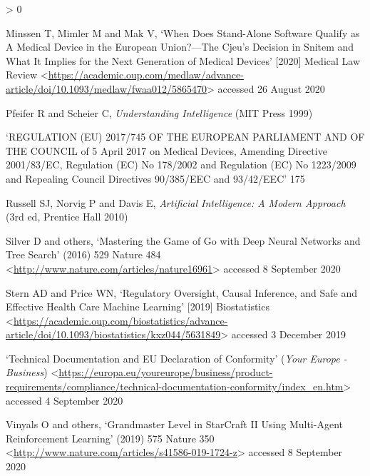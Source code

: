 \documentclass[
]{scrartcl}
\newlength{\cslhangindent}
\newenvironment{CSLReferences}[2] %
 {%
  \setlength{\parindent}{0pt}
  \ifodd #1 \everypar{\setlength{\hangindent}{\cslhangindent}}\ignorespaces\fi
  \ifnum #2 > 0
  \setlength{\parskip}{#2\baselineskip}
  \fi
 }%
 {}
\begin{document}
\begin{CSLReferences}{0}{0}
\leavevmode\hypertarget{ref-minssenWhenDoesStandAlone2020a}{}%
Minssen T, Mimler M and Mak V, {`When {Does Stand}-{Alone Software Qualify} as {A Medical Device} in the {European Union}?---{The Cjeu}'s {Decision} in {Snitem} and {What} It {Implies} for the {Next Generation} of {Medical Devices}'} {[}2020{]} Medical Law Review \textless{}\url{https://academic.oup.com/medlaw/advance-article/doi/10.1093/medlaw/fwaa012/5865470}\textgreater{} accessed 26 August 2020

\leavevmode\hypertarget{ref-pfeiferUnderstandingIntelligence1999a}{}%
Pfeifer R and Scheier C, \emph{Understanding Intelligence} ({MIT Press} 1999)

\leavevmode\hypertarget{ref-REGULATIONEU2017a}{}%
{`{REGULATION} ({EU}) 2017/745 {OF THE EUROPEAN PARLIAMENT AND OF THE COUNCIL} of 5 {April} 2017 on Medical Devices, Amending {Directive} 2001/83/{EC}, {Regulation} ({EC}) {No} 178/2002 and {Regulation} ({EC}) {No} 1223/2009 and Repealing {Council Directives} 90/385/{EEC} and 93/42/{EEC}'} 175

\leavevmode\hypertarget{ref-russellArtificialIntelligenceModern2010c}{}%
Russell SJ, Norvig P and Davis E, \emph{Artificial {Intelligence}: {A Modern Approach}} (3rd ed, {Prentice Hall} 2010)

\leavevmode\hypertarget{ref-silverMasteringGameGo2016}{}%
Silver D and others, {`Mastering the Game of {Go} with Deep Neural Networks and Tree Search'} (2016) 529 Nature 484 \textless{}\url{http://www.nature.com/articles/nature16961}\textgreater{} accessed 8 September 2020

\leavevmode\hypertarget{ref-sternRegulatoryOversightCausal2019a}{}%
Stern AD and Price WN, {`Regulatory {Oversight}, {Causal Inference}, and {Safe} and {Effective Health Care Machine Learning}'} {[}2019{]} Biostatistics \textless{}\url{https://academic.oup.com/biostatistics/advance-article/doi/10.1093/biostatistics/kxz044/5631849}\textgreater{} accessed 3 December 2019

\leavevmode\hypertarget{ref-TechnicalDocumentationEU}{}%
{`Technical Documentation and {EU} Declaration of Conformity'} (\emph{Your Europe - Business}) \textless{}\url{https://europa.eu/youreurope/business/product-requirements/compliance/technical-documentation-conformity/index_en.htm}\textgreater{} accessed 4 September 2020

\leavevmode\hypertarget{ref-vinyalsGrandmasterLevelStarCraft2019}{}%
Vinyals O and others, {`Grandmaster Level in {StarCraft II} Using Multi-Agent Reinforcement Learning'} (2019) 575 Nature 350 \textless{}\url{http://www.nature.com/articles/s41586-019-1724-z}\textgreater{} accessed 8 September 2020


\end{CSLReferences}
\end{document}
